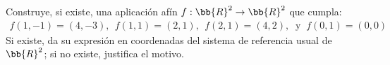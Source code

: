\documentclass[12pt]{article}
\begin{document}
    \begin{ejercicio}[2 puntos]
        Construye, si existe, una aplicación afín $f:\bb{R}^2 \rightarrow \bb{R}^2$ que cumpla:
        \begin{gather*}
            f(1,-1)=(4,-3),\ \ f(1,1)=(2,1),\ \ f(2,1)=(4,2),\ \text{ y }\  f(0,1)=(0,0)
        \end{gather*}
        Si existe, da su expresión en coordenadas del sistema de referencia usual de $\bb{R}^2$; si no existe, justifica el motivo.\\


\end{ejercicio}
\end{document}
